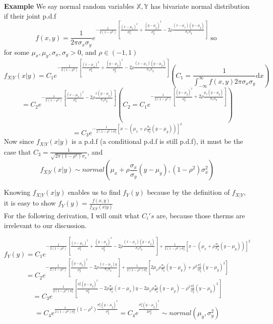 \documentclass[a4paper,12pt]{article}
\begin{document}
\textbf{Example} We say normal random variables $\mathbb{X}, \mathbb{Y}$ has bivariate normal distribution if their joint p.d.f
$$f(x, y) = \frac{1}{2\pi\sigma_x\sigma_y}e^{ -\frac{1}{2(1-\rho^2)} [\frac{(x-\mu_x)^2}{\sigma^2_x} + \frac{(y-\mu_y)^2}{\sigma^2_y} - 2\rho\frac{(x-\mu_x)(y-\mu_y)}{\sigma_x\sigma_y}]} \text{ so }$$
for some $\mu_x, \mu_y, \sigma_x, \sigma_y > 0$, and $\rho \in (-1, 1)$
$$f_{X|Y}(x|y) = C_1 e^{ -\frac{1}{2(1-\rho^2)} [\frac{(x-\mu_x)^2}{\sigma^2_x} + \frac{(y-\mu_y)^2}{\sigma^2_y} - 2\rho\frac{(x-\mu_x)(y-\mu_y)}{\sigma_x\sigma_y}]} (C_1 = \frac{1}{\int_{-\infty}^\infty f(x, y) 2\pi\sigma_x\sigma_y} \mathrm{d}x)$$
$$= C_2 e^{ -\frac{1}{2(1-\rho^2)} [\frac{(x-\mu_x)^2}{\sigma^2_x} - 2\rho\frac{x(y-\mu_y)}{\sigma_x\sigma_y}] } (C_2 = C_1 e^{-\frac{1}{2(1-\rho^2)} [ \frac{(y-\mu_y)^2}{\sigma^2_y} + 2\rho\frac{\mu_x(y-\mu_y)}{\sigma_x\sigma_y}]})$$
$$= C_3 e^{-\frac{1}{2(1-\rho^2)\sigma^2_x} [x-(\mu_x + \rho\frac{\sigma_x}{\sigma_y}(y-\mu_y))]^2}$$
Now since $f_{X|Y}(x|y)$ is a p.d.f (a conditional p.d.f is still p.d.f), it must be the case that $C_3 = \frac{1}{\sqrt{2\pi(1-\rho^2)}\sigma_x}$, and $$f_{X|Y}(x|y) \sim normal( \mu_x + \rho\frac{\sigma_x}{\sigma_y}(y-\mu_y), (1-\rho^2)\sigma^2_x )$$

Knowing $f_{X|Y}(x|y)$ enables us to find $f_Y(y)$ because by the definition of $f_{X|Y}$, it is easy to show $f_Y(y) = \frac{f(x, y)}{f_{X|Y}(x|y)} $\\

For the following derivation, I will omit what $C_i's$ are, because those therms are irrelevant to our discussion.

$$f_Y(y) = C_1 e^{ -\frac{1}{2(1-\rho^2)} [\frac{(x-\mu_x)^2}{\sigma^2_x} + \frac{(y-\mu_y)^2}{\sigma^2_y} - 2\rho\frac{(x-\mu_x)(y-\mu_y)}{\sigma_x\sigma_y}] + \frac{1}{2(1-\rho^2)\sigma^2_x} [x-(\mu_x + \rho\frac{\sigma_x}{\sigma_y}(y-\mu_y))]^2}$$
$$= C_2 e^{ -\frac{1}{2(1-\rho^2)} [ \frac{(y-\mu_y)^2}{\sigma^2_y} - 2\rho\frac{(x-\mu_x)y}{\sigma_x\sigma_y}] + \frac{1}{2(1-\rho^2)\sigma^2_x} [2\mu_x\rho\frac{\sigma_x}{\sigma_y}(y-\mu_y) + \rho^2\frac{\sigma^2_x}{\sigma^2_y}(y-\mu_y)^2]}$$
$$= C_3 e^{ \frac{1}{2(1-\rho^2)\sigma^2_x} [ \frac{\sigma^2_x(y-\mu_y)^2}{\sigma^2_y} - 2\rho\frac{\sigma_x}{\sigma_y}(x-\mu_x)y - 2\mu_x\rho\frac{\sigma_x}{\sigma_y}(y-\mu_y) - \rho^2\frac{\sigma^2_x}{\sigma^2_y}(y-\mu_y)^2]  }$$
$$= C_4 e^{ \frac{1}{2(1-\rho^2)\sigma^2_x}  (1-\rho^2) \frac{\sigma^2_x(y-\mu_y)^2}{\sigma^2_y}} = C_4 e^{ \frac{\sigma^2_x(y-\mu_y)^2}{2\sigma^2_y}} \sim normal( \mu_y, \sigma^2_y )$$
\end{document}
